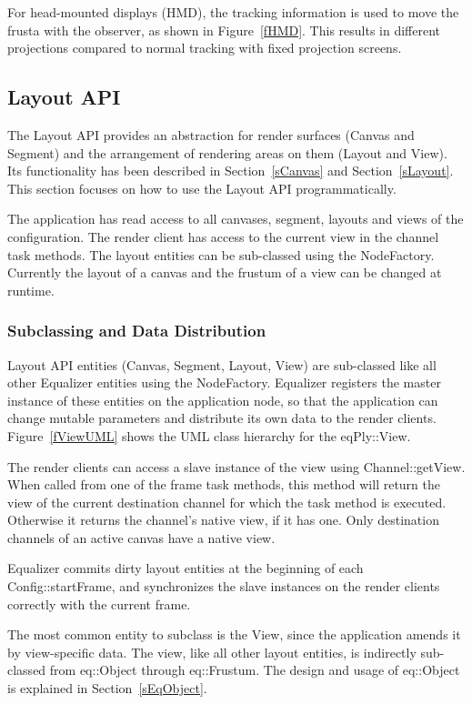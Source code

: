 \documentclass[10pt,a4]{scrartcl}
\newcommand{\fig}[1]{Figure~\ref{#1}}
\newcommand{\sref}[1]{Section~\ref{#1}}
\begin{document}
For head-mounted displays (HMD), the tracking information is used to
move the frusta with the observer, as shown in \fig{fHMD}. This results
in different projections compared to normal tracking with fixed
projection screens.

\subsection{\label{sLayoutAPI}Layout API}

The Layout API provides an abstraction for render surfaces (Canvas and
Segment) and the arrangement of rendering areas on them (Layout and
View). Its functionality has been described in \sref{sCanvas} and
\sref{sLayout}. This section focuses on how to use the Layout API
programmatically. 

The application has read access to all canvases, segment, layouts and
views of the configuration. The render client has access to the current
view in the channel task methods. The layout entities can be sub-classed
using the \textsf{NodeFactory}. Currently the layout of a canvas and the
frustum of a view can be changed at runtime.


\subsubsection{Subclassing and Data Distribution}

Layout API entities (Canvas, Segment, Layout, View) are sub-classed like
all other Equalizer entities using the \textsf{NodeFactory}. Equalizer
registers the master instance of these entities on the application node,
so that the application can change mutable parameters and distribute its
own data to the render clients. \fig{fViewUML} shows the UML class
hierarchy for the \textsf{eqPly::View}.

The render clients can access a slave instance of the view using
\textsf{Channel::getView}. When called from one of the frame task
methods, this method will return the view of the current destination
channel for which the task method is executed. Otherwise it returns the
channel's native view, if it has one. Only destination channels of an
active canvas have a native view.

Equalizer commits dirty layout entities at the beginning of each
\textsf{Config::startFrame}, and synchronizes the slave instances on the
render clients correctly with the current frame.

The most common entity to subclass is the \textsf{View}, since the
application amends it by view-specific data. The view, like all other
layout entities, is indirectly sub-classed from \textsf{eq::Object}
through \textsf{eq::Frustum}. The design and usage of
\textsf{eq::Object} is explained in \sref{sEqObject}. 
\end{document}
